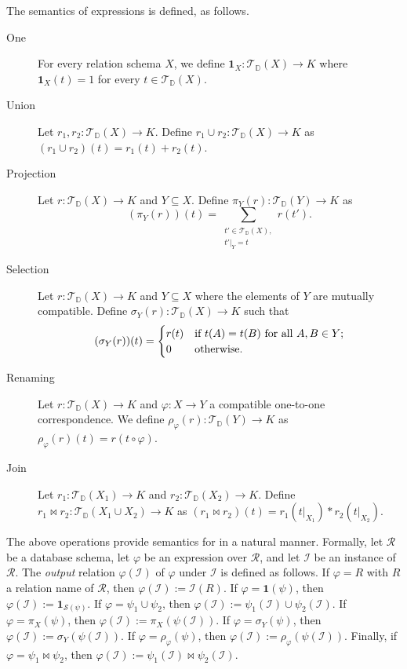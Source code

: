 The semantics of \ARA expressions is defined, as follows.

\begin{description}


\item[One] For every relation schema $X$,
  we define $\mathbf{1}_X: \mathcal{T}_{\mathbb{D}}(X) \to K$ where $\mathbf{1}_X(t) = 1$ for every $t \in \mathcal{T}_{\mathbb{D}}(X)$. 


\item[Union] Let $r_1, r_2: \mathcal{T}_{\mathbb{D}}(X) \to K$. Define $r_1 \cup r_2: \mathcal{T}_{\mathbb{D}}(X) \to K$ as $(r_1 \cup r_2)(t) = r_1(t) + r_2(t)$.


\item[Projection] Let $r: \mathcal{T}_{\mathbb{D}}(X) \to K$ and $Y \subseteq X$. Define $\pi_{Y}(r): \mathcal{T}_{\mathbb{D}}(Y) \to K$ as
\[
(\pi_{Y}(r))(t) = \sum_{\substack{t' \in \mathcal{T}_{\mathbb{D}}(X),\\ t'|_{Y} = t}} \!\! r(t').
\]


\item[Selection] Let $r: \mathcal{T}_{\mathbb{D}}(X) \to K$ and $Y \subseteq X$ where the elements of $Y$ are mutually compatible. Define $\sigma_{Y}(r): \mathcal{T}_{\mathbb{D}}(X) \to K$ such that
\[
(\sigma_{Y}(r))(t) =
\begin{cases}
r(t) & \text{if } t(A)=t(B) \text{ for all } A, B \in Y;\cr
0    & \text{otherwise}.
\end{cases}
\]


\item[Renaming] Let $r: \mathcal{T}_{\mathbb{D}}(X) \to K$ and $\varphi: X \to Y$ a compatible one-to-one correspondence. We define $\rho_\varphi(r): \mathcal{T}_{\mathbb{D}}(Y) \to K$ as $\rho_\varphi(r)(t) = r(t \circ \varphi)$.

\item[Join] Let $r_1: \mathcal{T}_{\mathbb{D}}(X_1) \to K$ and $r_2: \mathcal{T}_{\mathbb{D}}(X_2) \to K$. Define $r_1 \Join r_2: \mathcal{T}_{\mathbb{D}}(X_1 \cup X_2) \to K$ as $(r_1 \Join r_2)(t) = r_1(t|_{X_1})*r_2(t|_{X_2})$.
\end{description}

The above operations provide semantics for \ARA in a natural manner. Formally, let $\mathcal{R}$ be a database schema, let $\varphi$ be an \ARA expression over $\mathcal{R}$, and let $\mathcal{I}$ be an instance of $\mathcal{R}$. The \emph{output} relation $\varphi(\mathcal{I})$ of $\varphi$ under $\mathcal{I}$ is defined as follows. If $\varphi = R$ with $R$ a relation name of $\mathcal{R}$, then $\varphi(\mathcal{I}) := \mathcal{I}(R)$. If $\varphi = \mathbf{1}(\psi)$, then $\varphi(\mathcal{I}) := \mathbf{1}_{\mathcal{S}(\psi)}$. If $\varphi = \psi_1 \cup \psi_2$, then $\varphi(\mathcal{I}) := \psi_1(\mathcal{I}) \cup \psi_2(\mathcal{I})$. If $\varphi = \pi_{X}(\psi)$, then $\varphi(\mathcal{I}) := \pi_{X}(\psi(\mathcal{I}))$. If $\varphi = \sigma_{Y}(\psi)$, then $\varphi(\mathcal{I}) := \sigma_{Y}(\psi(\mathcal{I}))$. If $\varphi = \rho_\varphi(\psi)$, then $\varphi(\mathcal{I}) := \rho_\varphi(\psi(\mathcal{I}))$. Finally, if $\varphi = \psi_1 \Join \psi_2$, then $\varphi(\mathcal{I}) := \psi_1(\mathcal{I}) \Join \psi_2(\mathcal{I})$.


